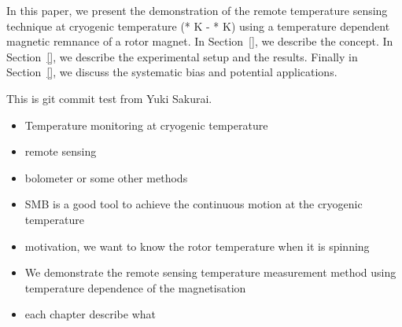 In this paper, we present the demonstration of the remote temperature sensing technique at cryogenic temperature (* K - * K) using a temperature dependent magnetic remnance of a rotor magnet. In Section~\ref{}, we describe the concept. In Section~\ref{}, we describe the experimental setup and the results. Finally in Section~\ref{}, we discuss the systematic bias and potential applications.

This is git commit test from Yuki Sakurai.
\begin{itemize}
\item Temperature monitoring at cryogenic temperature
\item remote sensing
\item bolometer or some other methods
\item SMB is a good tool to achieve the continuous motion at the cryogenic temperature
\item motivation, we want to know the rotor temperature when it is spinning
\item We demonstrate the remote sensing temperature measurement method using temperature dependence of the magnetisation
\item each chapter describe what
\end{itemize}
